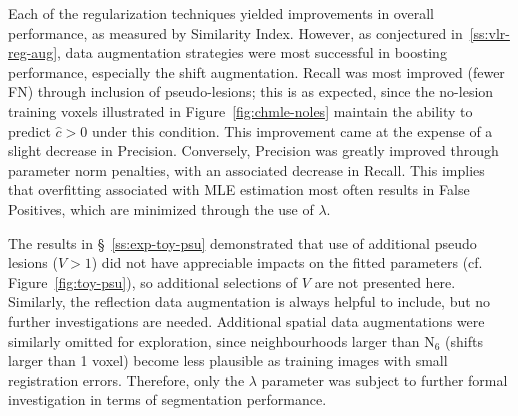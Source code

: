 Each of the regularization techniques yielded
improvements in overall performance, as measured by Similarity Index.
However, as conjectured in~\ref{ss:vlr-reg-aug},
data augmentation strategies were most successful in boosting performance,
especially the shift augmentation.
Recall was most improved (fewer FN) through inclusion of pseudo-lesions; this is as expected,
since the no-lesion training voxels illustrated in Figure~\ref{fig:chmle-noles}
maintain the ability to predict $\hat{c} > 0$ under this condition.
This improvement came at the expense of a slight decrease in Precision.
Conversely, Precision was greatly improved through parameter norm penalties,
with an associated decrease in Recall.
This implies that overfitting associated with MLE estimation
most often results in False Positives,
which are minimized through the use of $\lambda$.
\par
The results in \S~\ref{ss:exp-toy-psu} demonstrated that use of additional
pseudo lesions ($V > 1$) did not have appreciable impacts on the fitted parameters
(cf. Figure~\ref{fig:toy-psu}), so additional selections of $V$ are not presented here.
Similarly, the reflection data augmentation is always helpful to include,
but no further investigations are needed.
Additional spatial data augmentations were similarly omitted for exploration,
since neighbourhoods larger than $\mathrm{N}_6$ (shifts larger than 1 voxel)
become less plausible as training images with small registration errors.
Therefore, only the $\lambda$ parameter was subject to further formal investigation
in terms of segmentation performance.
